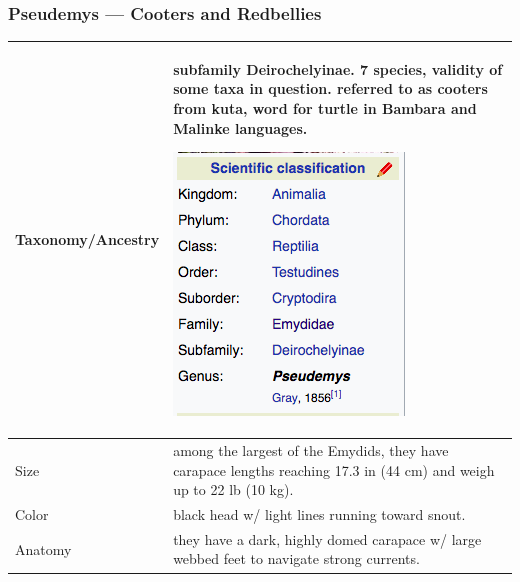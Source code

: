 \subsubsection{Pseudemys --- Cooters and Redbellies}
\begin{center}
\begin{longtabu} to 

	\hline
	Taxonomy/Ancestry &
	subfamily Deirochelyinae. 7 species, validity of some taxa in question. referred to as cooters from kuta, word for turtle in Bambara and Malinke languages.
	
	\begin{center} \includegraphics[scale=0.5]{testudines/emydidae/pseudemys/tax} \end{center}
	 \\
	\hline
	Size & 
	among the largest of the Emydids, they have carapace lengths reaching 17.3 in (44 cm) and weigh up to 22 lb (10 kg).
	\\
	\hline
	Color &
	black head w/ light lines running toward snout.
	 \\
	\hline
	Anatomy &
	they have a dark, highly domed carapace w/ large webbed feet to navigate strong currents.
	

\end{longtabu}
\end{center}
